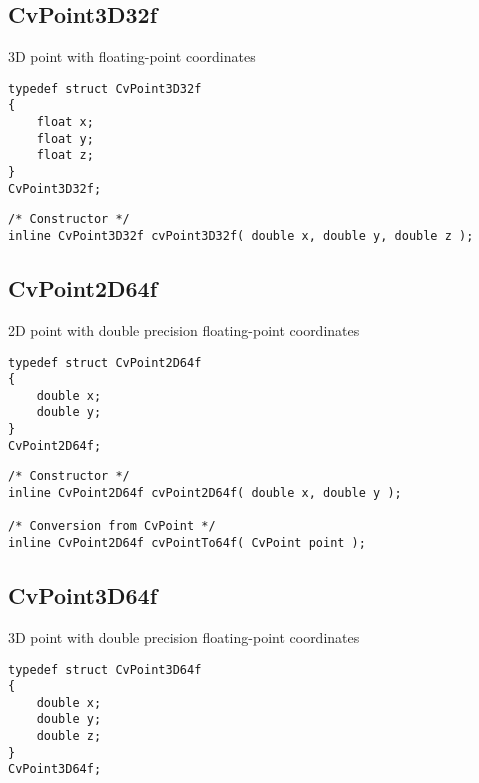 \subsection{CvPoint3D32f}\label{CvPoint3D32f}
3D point with floating-point coordinates

\begin{lstlisting}
typedef struct CvPoint3D32f
{
    float x; 
    float y; 
    float z; 
}
CvPoint3D32f;
\end{lstlisting}

\begin{description}
\end{description}

\begin{lstlisting}
/* Constructor */
inline CvPoint3D32f cvPoint3D32f( double x, double y, double z );
\end{lstlisting}

\subsection{CvPoint2D64f}\label{CvPoint2D64f}
2D point with double precision floating-point coordinates

\begin{lstlisting}
typedef struct CvPoint2D64f
{
    double x; 
    double y; 
}
CvPoint2D64f;
\end{lstlisting}

\begin{description}
\end{description}

\begin{lstlisting}
/* Constructor */
inline CvPoint2D64f cvPoint2D64f( double x, double y );

/* Conversion from CvPoint */
inline CvPoint2D64f cvPointTo64f( CvPoint point );
\end{lstlisting}

\subsection{CvPoint3D64f}\label{CvPoint3D64f}
3D point with double precision floating-point coordinates

\begin{lstlisting}
typedef struct CvPoint3D64f
{
    double x; 
    double y; 
    double z; 
}
CvPoint3D64f;
\end{lstlisting}

